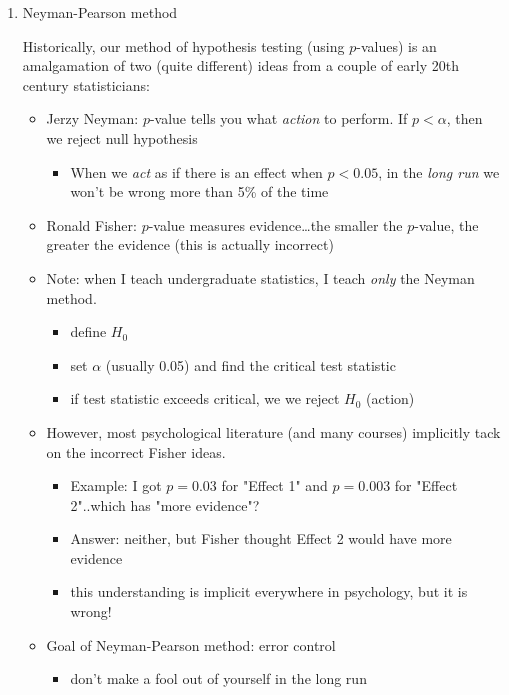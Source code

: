 \documentclass{foils}
\begin{document}
\begin{enumerate}
\item Neyman-Pearson method
\label{sec-3-1}

Historically, our method of hypothesis testing (using $p$-values) is an amalgamation of two (quite different) ideas from a couple of early 20th century statisticians:

\begin{itemize}
\item Jerzy Neyman: $p$-value tells you what \emph{action} to perform.  If $p<\alpha$, then we reject null hypothesis
\begin{itemize}
\item When we \emph{act} as if there is an effect when $p<0.05$, in the \emph{long run} we won't be wrong more than 5\% of the time
\end{itemize}
\item Ronald Fisher: $p$-value measures evidence\ldots{}the smaller the $p$-value, the greater the evidence (this is actually incorrect)
\item Note: when I teach undergraduate statistics, I teach \emph{only} the Neyman method.  
\begin{itemize}
\item define $H_0$
\item set $\alpha$ (usually 0.05) and find the critical test statistic
\item if test statistic exceeds critical, we we reject $H_0$ (action)
\end{itemize}
\item However, most psychological literature (and many courses) implicitly tack on the incorrect Fisher ideas.  
\begin{itemize}
\item Example: I got $p=0.03$ for "Effect 1" and $p=0.003$ for "Effect 2"..which has "more evidence"?
\item Answer: neither, but Fisher thought Effect 2 would have more evidence
\item this understanding is implicit everywhere in psychology, but it is wrong!
\end{itemize}
\item Goal of Neyman-Pearson method: error control
\begin{itemize}
\item don't make a fool out of yourself in the long run
\end{itemize}
\end{itemize}
\end{enumerate}
\end{document}
